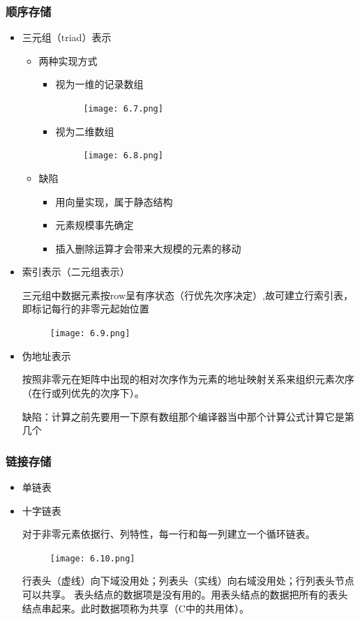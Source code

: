 \documentclass[AutoFakeBold]{LZUThesis2007}
\begin{document}
			\subsubsection{顺序存储}
\begin{itemize}
	\item 三元组（triad）表示
		\begin{itemize}
			\item 两种实现方式
				\begin{itemize}
					\item 视为一维的记录数组
\begin{figure}[H]
    \centering
    \texttt{[image: 6.7.png]}
    \label{fig_install_texlive}
\end{figure}
					\item 视为二维数组
\begin{figure}[H]
    \centering
    \texttt{[image: 6.8.png]}
    \label{fig_install_texlive}
\end{figure}
				\end{itemize}
			\item 缺陷
				\begin{itemize}
					\item 用向量实现，属于静态结构
					\item 元素规模事先确定
					\item 插入删除运算才会带来大规模的元素的移动
				\end{itemize}

		\end{itemize}

	\item 索引表示（二元组表示）

三元组中数据元素按row呈有序状态（行优先次序决定）,故可建立行索引表，即标记每行的非零元起始位置
\begin{figure}[H]
    \centering
    \texttt{[image: 6.9.png]}
    \label{fig_install_texlive}
\end{figure}
	\item 伪地址表示

按照非零元在矩阵中出现的相对次序作为元素的地址映射关系来组织元素次序（在行或列优先的次序下）。
			
缺陷：计算之前先要用一下原有数组那个编译器当中那个计算公式计算它是第几个

\end{itemize}
			\subsubsection{链接存储}
				\begin{itemize}
					\item 单链表
					\item 十字链表

对于非零元素依据行、列特性，每一行和每一列建立一个循环链表。
\begin{figure}[H]
    \centering
    \texttt{[image: 6.10.png]}
    \label{fig_install_texlive}
\end{figure}
行表头（虚线）向下域没用处；列表头（实线）向右域没用处；行列表头节点可以共享。
表头结点的数据项是没有用的。用表头结点的数据把所有的表头结点串起来。此时数据项称为共享（C中的共用体）。
				\end{itemize}
\end{document}
